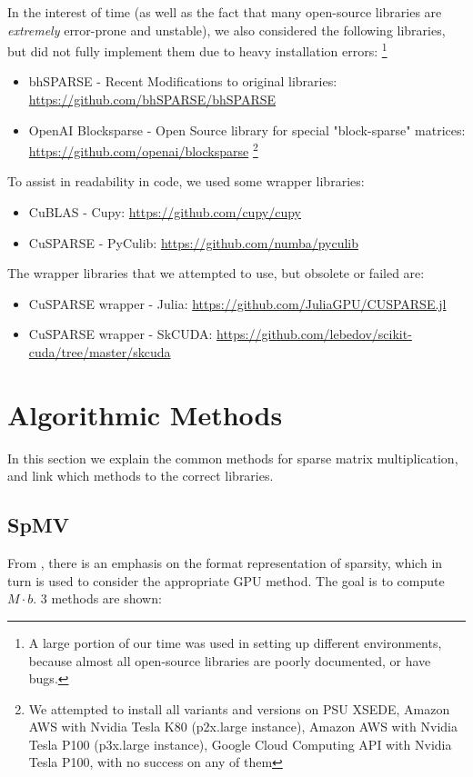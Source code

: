 \documentclass[12pt]{article}
\begin{document}
In the interest of time (as well as the fact that many open-source libraries are \textit{extremely} error-prone and unstable), we also considered the following libraries, but did not fully implement them due to heavy installation errors: \footnote{A large portion of our time was used in setting up different environments, because almost all open-source libraries are poorly documented, or have bugs.}
\begin{itemize}
\item bhSPARSE - Recent Modifications to original libraries: \url{https://github.com/bhSPARSE/bhSPARSE}
\item OpenAI Blocksparse - Open Source library for special "block-sparse" matrices: \url{https://github.com/openai/blocksparse} \footnote{We attempted to install all variants and versions on PSU XSEDE, Amazon AWS with Nvidia Tesla K80 (p2x.large instance), Amazon AWS with Nvidia Tesla P100 (p3x.large instance), Google Cloud Computing API with Nvidia Tesla P100, with no success on any of them}
\end{itemize}

To assist in readability in code, we used some wrapper libraries:
\begin{itemize}
\item CuBLAS - Cupy: \url{https://github.com/cupy/cupy}
\item CuSPARSE - PyCulib: \url{https://github.com/numba/pyculib}
\end{itemize}

The wrapper libraries that we attempted to use, but obsolete or failed are:
\begin{itemize}
\item CuSPARSE wrapper - Julia: \url{https://github.com/JuliaGPU/CUSPARSE.jl}
\item CuSPARSE wrapper - SkCUDA: \url{https://github.com/lebedov/scikit-cuda/tree/master/skcuda}
\end{itemize}

\section{Algorithmic Methods}
In this section we explain the common methods for sparse matrix multiplication, and link which methods to the correct libraries.

\subsection{SpMV}
From \cite{spmv_cuda}, there is an emphasis on the format representation of sparsity, which in turn is used to consider the appropriate GPU method. The goal is to compute $M \cdot b$. 3 methods are shown: 
\end{document}
